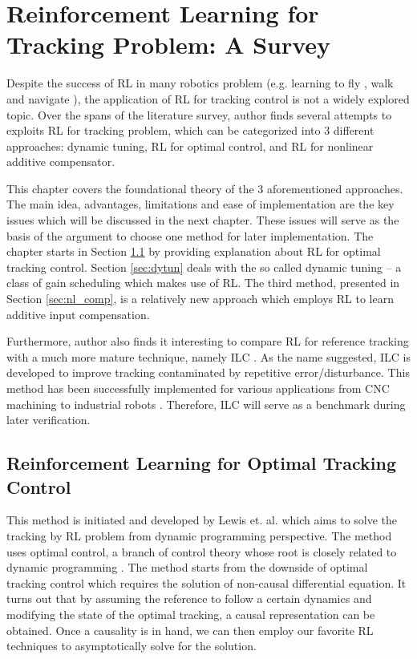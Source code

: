 %
\chapter{Reinforcement Learning for Tracking Problem: A Survey} \label{chap::survey}
Despite the success of \ac{RL} in many robotics problem (e.g. learning to fly \cite{Abbeel}, walk \cite{NIPS2007_3253} and navigate \cite{4543641}), the application of \ac{RL} for tracking control is not a widely explored topic. Over the spans of the literature survey, author finds several attempts to exploits \ac{RL} for tracking problem, which can be categorized into 3 different approaches: dynamic tuning, \ac{RL} for optimal control, and \ac{RL} for nonlinear additive compensator. 

This chapter covers the foundational theory of the 3 aforementioned approaches. The main idea, advantages, limitations and ease of implementation are the key issues which will be discussed in the next chapter. These issues will serve as the basis of the argument to choose one method for later implementation. The chapter starts in Section \ref{sec:rl_lqt} by providing explanation about \ac{RL} for optimal tracking control. Section \ref{sec:dytun} deals with the so called dynamic tuning -- a class of gain scheduling which makes use of \ac{RL}. The third method, presented in Section \ref{sec:nl_comp}, is a relatively new approach which employs \ac{RL} to learn additive input compensation.

Furthermore, author also finds it interesting to compare \ac{RL} for reference tracking with a much more mature technique, namely \ac{ILC} \cite{4048052}. As the name suggested, \ac {ILC} is developed to improve tracking contaminated by repetitive error/disturbance. This method has been successfully implemented for various applications from CNC machining \cite{299157} to industrial robots \cite{1044377}. Therefore, \ac {ILC} will serve as a benchmark during later verification.


\section{Reinforcement Learning for Optimal Tracking Control} \label{sec:rl_lqt}
This method is initiated and developed by Lewis et. al. which aims to solve the tracking by \ac{RL} problem from dynamic programming perspective. The method uses optimal control, a branch of control theory whose root is closely related to dynamic programming \cite{126844}. The method starts from the downside of optimal tracking control which requires the solution of non-causal differential equation. It turns out that by assuming the reference to follow a certain dynamics and modifying the state of the optimal tracking, a causal representation can be obtained. Once a causality is in hand, we can then employ our favorite \ac{RL} techniques to asymptotically solve for the solution. 

